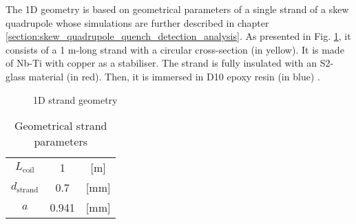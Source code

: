 
The 1D geometry is based on geometrical parameters of a single strand of a skew quadrupole whose simulations are further described in chapter \ref{section:skew_quadrupole_quench_detection_analysis}. As presented in Fig. \ref{fig: 1d_strand_geometry}, it consists of a 1 m-long strand with a circular cross-section (in yellow). It is made of Nb-Ti with copper as a stabiliser. The strand is fully insulated with an S2-glass material (in red). Then, it is immersed in D10 epoxy resin (in blue) \cite{hl_lhc_tech_design_report_v01}.

\begin{figure}[H]
    \centering
    \caption{1D strand geometry}
    \label{fig: 1d_strand_geometry}
\end{figure}

\begin{table}[h!]
    \caption{Geometrical strand parameters} 
    \vspace{-1.em} 
    \fontsize{10}{10}
    \selectfont 
    \renewcommand{\arraystretch}{1.5}
    \begin{center}
        \begin{tabular}{ ccc }  
        \hline
        $L_\text{coil}$ & 1 & [m] \\
        $d_\text{strand}$ & 0.7 & [mm] \\
        $a$ & 0.941 & [mm] \\
        \hline 
        \end{tabular}
    \end{center}  
     \label{table: 1d_quench_propagation_geometry_parameters} 
 \end{table}

